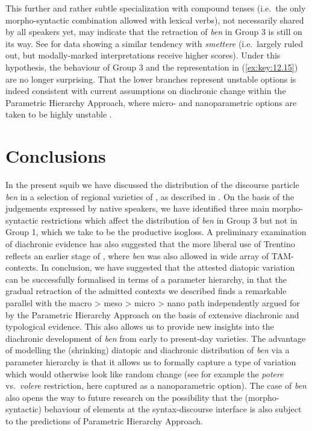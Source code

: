 \documentclass[output=paper]{langsci/langscibook}
\begin{document}
{This further and rather subtle specialization with compound tenses (i.e.\ the
only morpho-syntactic combination allowed with lexical verbs), not necessarily
shared by all speakers yet, may indicate that the retraction of \emph{ben} in
Group 3 is still on its way. See \citet{CognSchi2015} for data showing a
similar tendency with \emph{smettere} (i.e.\ largely ruled out, but
modally-marked interpretations receive higher scores).} Under this hypothesis,
the behaviour of Group 3 and the representation in (\ref{ex:key:12.15}) are no longer
surprising. That the lower branches represent unstable options is indeed
consistent with current assumptions on diachronic change within the Parametric
Hierarchy Approach, where micro- and nanoparametric options are taken to be
highly unstable \parencite[261]{BibRob2016}.

\section{Conclusions}\label{sec:23-conclusions}

In the present squib we have discussed the distribution of the discourse
particle \emph{ben} in a selection of regional varieties of , as
described in \textcite{CognSchi2015,CognSchi2018b,CognSchi2018}. On the basis
of the judgements expressed by native speakers, we have identified three main
morpho-syntactic restrictions which affect the distribution of \emph{ben} in
Group 3 but not in Group 1, which we take to be the productive isogloss. A
preliminary examination of diachronic evidence has also suggested that the more
liberal use of Trentino reflects an earlier stage of , where
\emph{ben} was also allowed in wide array of TAM-contexts. In conclusion, we
have suggested that the attested diatopic variation can be successfully
formalised in terms of a parameter hierarchy, in that the gradual retraction of
the admitted contexts we described finds a remarkable parallel with the macro >
meso > micro > nano path independently argued for by the Parametric Hierarchy
Approach on the basis of extensive diachronic and typological evidence. This
also allows us to provide new insights into the diachronic development of
\emph{ben} from early  to present-day varieties. The advantage of
modelling the (shrinking) diatopic and diachronic distribution of \emph{ben}
via a parameter hierarchy is that it allows us to formally capture a type of
variation which would otherwise look like random change (see for example the
\emph{potere} vs.\ \emph{volere} restriction, here captured as a nanoparametric
option). The case of  \emph{ben} also opens the way to future research
on the possibility that the (morpho-syntactic) behaviour of elements at the
syntax-discourse interface is also subject to the predictions of Parametric
Hierarchy Approach.
\end{document}
